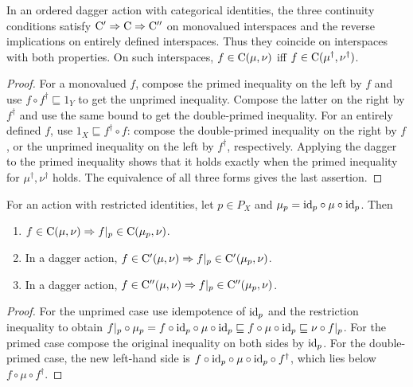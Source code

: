 \begin{thm}\label{cont-eq}
In an ordered dagger action with categorical identities, the three
continuity conditions satisfy
$\mathrm{C}'\Rightarrow\mathrm{C}\Rightarrow\mathrm{C}''$ on
monovalued interspaces and the reverse implications on entirely defined
interspaces. Thus they coincide on interspaces with both properties.
On such interspaces,
$f\in\mathrm{C}(\mu,\nu)$ iff
$f\in\mathrm{C}(\mu^\dagger,\nu^\dagger)$.
\end{thm}

\begin{proof}
For a monovalued $f$, compose the primed inequality on the left by $f$
and use $f\circ f^\dagger\sqsubseteq1_Y$ to get the unprimed
inequality. Compose the latter on the right by $f^\dagger$ and use
the same bound to get the double-primed inequality. For an entirely
defined $f$, use $1_X\sqsubseteq f^\dagger\circ f$: compose the
double-primed inequality on the right by $f$, or the unprimed
inequality on the left by $f^\dagger$, respectively.
Applying the dagger to the primed inequality shows that it holds
exactly when the primed inequality for $\mu^\dagger,\nu^\dagger$
holds. The equivalence of all three forms gives the last assertion.
\end{proof}

\begin{thm}\label{rect-cont}
For an action with restricted identities, let $p\in P_X$ and
$\mu_p={\operatorname{id}}_p\circ\mu\circ{\operatorname{id}}_p$. Then
\begin{enumerate}
\item\label{contrestr-C}
$f\in\mathrm{C}(\mu,\nu)\Rightarrow f|_p\in\mathrm{C}(\mu_p,\nu)$.
\item\label{contrestr-Ci}
In a dagger action,
$f\in\mathrm{C}'(\mu,\nu)\Rightarrow f|_p\in\mathrm{C}'(\mu_p,\nu)$.
\item\label{contrestr-Cii}
In a dagger action,
$f\in\mathrm{C}''(\mu,\nu)\Rightarrow f|_p\in\mathrm{C}''(\mu_p,\nu)$.
\end{enumerate}
\end{thm}

\begin{proof}
For the unprimed case use idempotence of ${\operatorname{id}}_p$ and the restriction
inequality to obtain
$f|_p\circ\mu_p=f\circ{\operatorname{id}}_p\circ\mu\circ{\operatorname{id}}_p
\sqsubseteq f\circ\mu\circ{\operatorname{id}}_p\sqsubseteq\nu\circ f|_p$.
For the primed case compose the original inequality on both sides by
${\operatorname{id}}_p$. For the double-primed case, the new left-hand side is
$f\circ{\operatorname{id}}_p\circ\mu\circ{\operatorname{id}}_p\circ f^\dagger$, which lies
below $f\circ\mu\circ f^\dagger$.
\end{proof}

